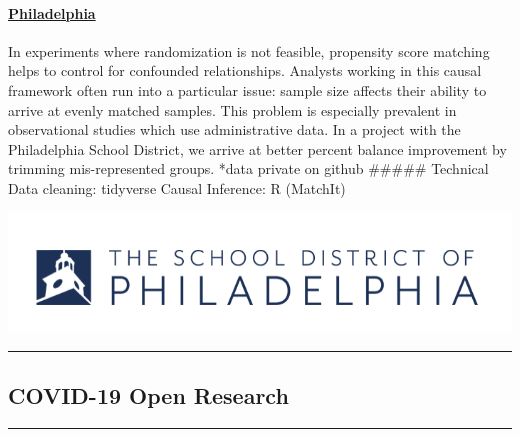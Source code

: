 \documentclass[
]{article}
\begin{document}
\begin{row}

\begin{col-sm-6}

\hypertarget{philadelphia}{%
\paragraph{\texorpdfstring{\href{https://katjanewilson.github.io/WhartonAnalytics-MLB/}{Philadelphia}}{Philadelphia}}\label{philadelphia}}

In experiments where randomization is not feasible, propensity score
matching helps to control for confounded relationships. Analysts working
in this causal framework often run into a particular issue: sample size
affects their ability to arrive at evenly matched samples. This problem
is especially prevalent in observational studies which use
administrative data. In a project with the Philadelphia School District,
we arrive at better percent balance improvement by trimming
mis-represented groups. *data private on github \#\#\#\#\# Technical
Data cleaning: tidyverse Causal Inference: R (MatchIt)

\end{col-sm-6}

\begin{col-sm-6}

\includegraphics[width=800px]{images/philly}

\end{col-sm-6}

\end{row}

\begin{center}\rule{0.5\linewidth}{0.5pt}\end{center}

\hypertarget{covid-19-open-research}{%
\subsection{COVID-19 Open Research}\label{covid-19-open-research}}

\begin{center}\rule{0.5\linewidth}{0.5pt}\end{center}
\end{document}

